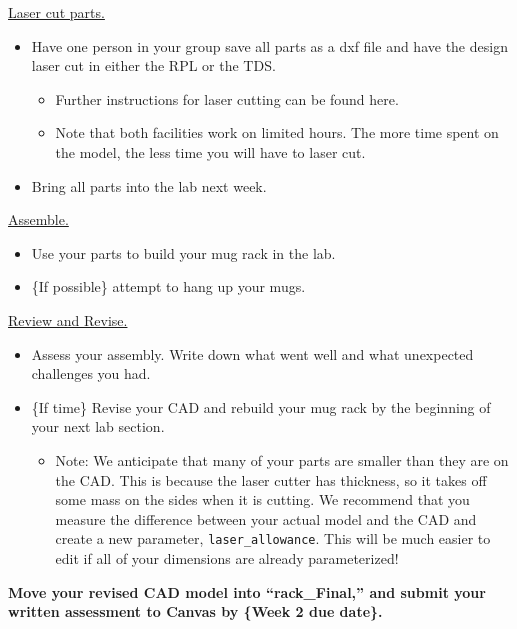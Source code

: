 \documentclass[11pt,letterpaper]{article}
\begin{document}
\medskip
{}
\begin{AssignmentSteps}[start=5]
  \item \underline{Laser cut parts.}
\end{AssignmentSteps}
\begin{itemize}
  \item Have one person in your group save all parts as a dxf file and have the design laser cut in either the RPL or the TDS.
  \begin{itemize}
    \item Further instructions for laser cutting can be found here.
    \item Note that both facilities work on limited hours. The more time spent on the model, the less time you will have to laser cut.
  \end{itemize}
  \item Bring all parts into the lab next week.
\end{itemize}
\begin{AssignmentSteps}[start=6]
  \item \underline{Assemble.}
\end{AssignmentSteps}
\begin{itemize}
  \item Use your parts to build your mug rack in the lab.
  \item \{If possible\} attempt to hang up your mugs.
\end{itemize}
\begin{AssignmentSteps}[start=7]
  \item \underline{Review and Revise.}
\end{AssignmentSteps}
\begin{itemize}
  \item Assess your assembly. Write down what went well and what unexpected challenges you had.
  \item \{If time\} Revise your CAD and rebuild your mug rack by the beginning of your next lab section.
  \begin{itemize}
    \item Note: We anticipate that many of your parts are smaller than they are on the CAD. This is because the laser cutter has thickness, so it takes off some mass on the sides when it is cutting. We recommend that you measure the difference between your actual model and the CAD and create a new parameter,
    \texttt{laser\_allowance}. This will be much easier to edit if all of your dimensions are already parameterized!
  \end{itemize}
\end{itemize}
\textbf{Move your revised CAD model into ``rack\_Final,'' and submit your written assessment to Canvas by \{Week 2 due date\}.}
\end{document}
